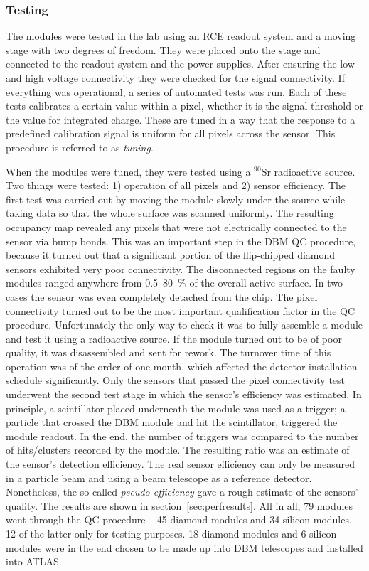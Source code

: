 \documentclass[12pt]{packages/mytustyle}  %
\begin{document}
\subsubsection{Testing}
The modules were tested in the lab using an RCE readout system and a moving stage with two degrees of freedom. They were placed onto the stage and connected to the readout system and the power supplies. After ensuring the low- and high voltage connectivity they were checked for the signal connectivity. If everything was operational, a series of automated tests was run. Each of these tests calibrates a certain value within a pixel, whether it is the signal threshold or the value for integrated charge. These are tuned in a way that the response to a predefined calibration signal is uniform for all pixels across the sensor. This procedure is referred to as \emph{tuning}. 

When the modules were tuned, they were tested using a $^{90}$Sr radioactive source. Two things were tested: 1) operation of all pixels and 2) sensor efficiency. The first test was carried out by moving the module slowly under the source while taking data so that the whole surface was scanned uniformly. The resulting occupancy map revealed any pixels that were not electrically connected to the sensor via bump bonds. This was an important step in the DBM QC procedure, because it turned out that a significant portion of the flip-chipped diamond sensors exhibited very poor connectivity. The disconnected regions on the faulty modules ranged anywhere from 0.5--80~\% of the overall active surface. In two cases the sensor was even completely detached from the chip. The pixel connectivity turned out to be the most important qualification factor in the QC procedure. Unfortunately the only way to check it was to fully assemble a module and test it using a radioactive source. If the module turned out to be of poor quality, it was disassembled and sent for rework. The turnover time of this operation was of the order of one month, which affected the detector installation schedule significantly. Only the sensors that passed the pixel connectivity test underwent the second test stage in which the sensor's efficiency was estimated. In principle, a scintillator placed underneath the module was used as a trigger; a particle that crossed the DBM module and hit the scintillator, triggered the module readout. In the end, the number of triggers was compared to the number of hits/clusters recorded by the module. The resulting ratio was an estimate of the sensor's detection efficiency. The real sensor efficiency can only be measured in a particle beam and using a beam telescope as a reference detector. Nonetheless, the so-called \emph{pseudo-efficiency} gave a rough estimate of the sensors' quality. The results are shown in section~\ref{sec:perfresults}.  All in all, 79 modules went through the QC procedure -- 45 diamond modules and 34 silicon modules, 12 of the latter only for testing purposes. 18 diamond modules and 6 silicon modules were in the end chosen to be made up into DBM telescopes and installed into ATLAS.
\end{document}

